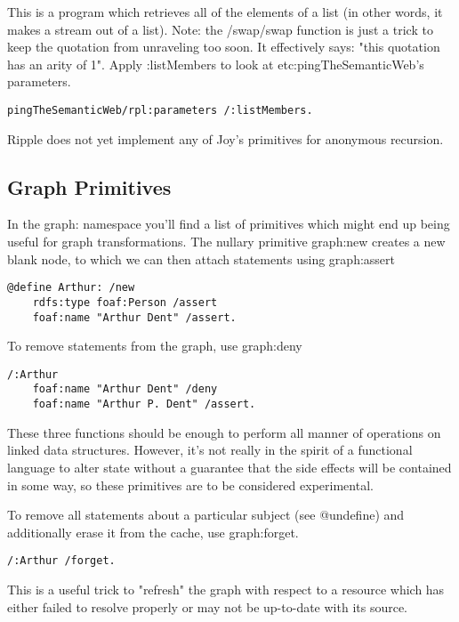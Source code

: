 \documentclass[runningheads]{llncs}
\begin{document}
This is a program which retrieves all of the elements of a list (in other words, it makes a stream out of a list).  Note: the /swap/swap function is just a trick to keep the quotation from unraveling too soon.  It effectively says: "this quotation has an arity of 1".  Apply :listMembers to look at etc:pingTheSemanticWeb's parameters.

\begin{verbatim}
pingTheSemanticWeb/rpl:parameters /:listMembers.
\end{verbatim}

Ripple does not yet implement any of Joy's primitives for anonymous recursion.

\subsection{Graph Primitives}

In the graph: namespace you'll find a list of primitives which might end up being useful for graph transformations.  The nullary primitive graph:new creates a new blank node, to which we can then attach statements using graph:assert

\begin{verbatim}
@define Arthur: /new
    rdfs:type foaf:Person /assert
    foaf:name "Arthur Dent" /assert.
\end{verbatim}

To remove statements from the graph, use graph:deny

\begin{verbatim}
/:Arthur
    foaf:name "Arthur Dent" /deny
    foaf:name "Arthur P. Dent" /assert.
\end{verbatim}

These three functions should be enough to perform all manner of operations on linked data structures.  However, it's not really in the spirit of a functional language to alter state without a guarantee that the side effects will be contained in some way, so these primitives are to be considered experimental.

To remove all statements about a particular subject (see @undefine) and additionally erase it from the cache, use graph:forget.

\begin{verbatim}
/:Arthur /forget.
\end{verbatim}

This is a useful trick to "refresh" the graph with respect to a resource which has either failed to resolve properly or may not be up-to-date with its source.
\end{document}
